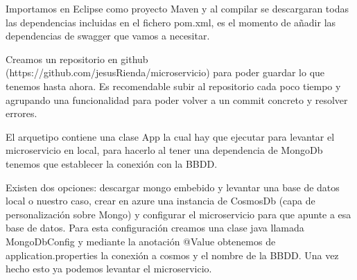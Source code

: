 \documentclass[12pt]{report} %
\begin{document}
Importamos en Eclipse como proyecto Maven y al compilar se descargaran todas las dependencias incluidas en el fichero pom.xml, es el momento de añadir las dependencias de swagger que vamos a necesitar.

Creamos un repositorio en github (https://github.com/jesusRienda/microservicio) para poder guardar lo que tenemos hasta ahora. Es recomendable subir al repositorio cada poco tiempo y agrupando una funcionalidad para poder volver a un commit concreto y resolver errores.

El arquetipo contiene una clase App la cual hay que ejecutar para levantar el microservicio en local, para hacerlo al tener una dependencia de MongoDb tenemos que establecer la conexión con la BBDD.

 Existen dos opciones: descargar mongo embebido y levantar una base de datos local o nuestro caso, crear en azure una instancia de CosmosDb (capa de personalización sobre Mongo) y configurar el microservicio para que apunte a esa base de datos. Para esta configuración creamos una clase java llamada MongoDbConfig y mediante la anotación @Value obtenemos de application.properties la conexión a cosmos y el nombre de la BBDD. Una vez hecho esto ya podemos levantar el microservicio.
\end{document}
